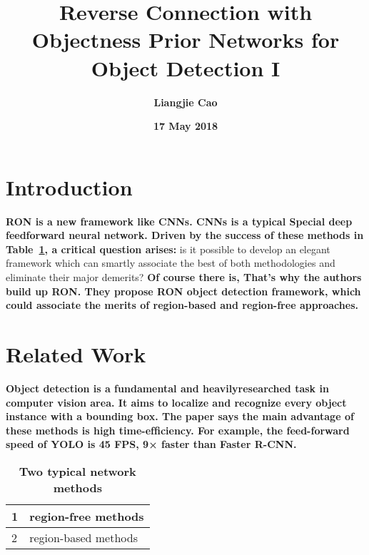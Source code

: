 \documentclass[35pt]{article}
\begin{document}
\title{\textbf{Reverse Connection with Objectness Prior Networks for Object Detection I}}
\author{\textbf{Liangjie Cao}}
\date{\textbf{17 May 2018}}
\maketitle
\par
\setlength{\baselineskip}{15pt}
\section{Introduction}
\textbf{RON is a new framework like CNNs. CNNs\cite{name1} is a typical Special deep feedforward neural network. Driven by the success of these methods in Table~\ref{Table1}, a critical question arises: }is it possible to develop an elegant framework which can smartly associate the best of both methodologies and eliminate their major demerits? \textbf{Of course there is, That's why the authors build up RON. They propose RON object detection framework, which could associate the merits of region-based and region-free approaches.~\cite{name2}}
\par
\section{Related Work}
\textbf{Object detection is a fundamental and heavilyresearched task in computer vision area. It aims to localize and recognize every object instance with a bounding box.\cite{name3} The paper says the main advantage of these methods is high time-efﬁciency. For example, the feed-forward speed of YOLO is 45 FPS, 9× faster than Faster R-CNN.}
 \begin{table}[!htbp]
  \centering
 \begin{tabular}{|p{2cm}|p{2cm}|}
    \hline
    1 & region-free methods\\
    \hline
     2 & region-based methods\\
    \hline
  \end{tabular}
  \caption{\textbf{Two typical network methods}} \label{Table1}
  \end{table}
\par
\end{document}
